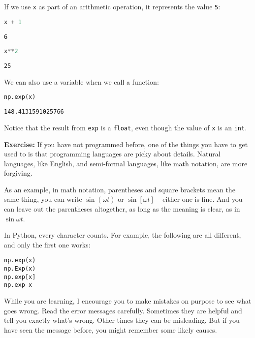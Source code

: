 If we use \passthrough{\lstinline!x!} as part of an arithmetic
operation, it represents the value \passthrough{\lstinline!5!}:

\begin{lstlisting}[language=Python,style=source]
x + 1
\end{lstlisting}

\begin{lstlisting}[style=output]
6
\end{lstlisting}

\begin{lstlisting}[language=Python,style=source]
x**2
\end{lstlisting}

\begin{lstlisting}[style=output]
25
\end{lstlisting}

We can also use a variable when we call a function:

\begin{lstlisting}[language=Python,style=source]
np.exp(x)
\end{lstlisting}

\begin{lstlisting}[style=output]
148.4131591025766
\end{lstlisting}

Notice that the result from \passthrough{\lstinline!exp!} is a
\passthrough{\lstinline!float!}, even though the value of
\passthrough{\lstinline!x!} is an \passthrough{\lstinline!int!}.

\textbf{Exercise:} If you have not programmed before, one of the things
you have to get used to is that programming languages are picky about
details. Natural languages, like English, and semi-formal languages,
like math notation, are more forgiving.

As an example, in math notation, parentheses and square brackets mean
the same thing, you can write \(\sin (\omega t)\) or \(\sin [\omega t]\)
-- either one is fine. And you can leave out the parentheses altogether,
as long as the meaning is clear, as in \(\sin \omega t\).

In Python, every character counts. For example, the following are all
different, and only the first one works:

\begin{lstlisting}[style=output]
np.exp(x)
np.Exp(x)
np.exp[x]
np.exp x
\end{lstlisting}

While you are learning, I encourage you to make mistakes on purpose to
see what goes wrong. Read the error messages carefully. Sometimes they
are helpful and tell you exactly what's wrong. Other times they can be
misleading. But if you have seen the message before, you might remember
some likely causes.

